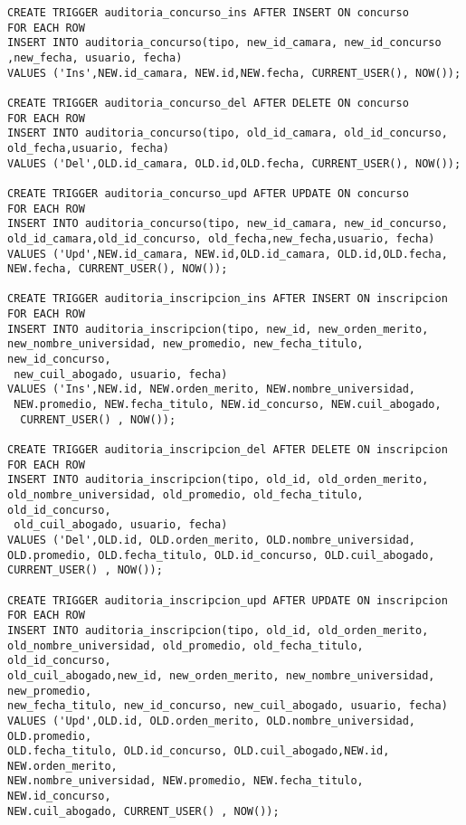 \begin{verbatim}
CREATE TRIGGER auditoria_concurso_ins AFTER INSERT ON concurso
FOR EACH ROW
INSERT INTO auditoria_concurso(tipo, new_id_camara, new_id_concurso
,new_fecha, usuario, fecha)
VALUES ('Ins',NEW.id_camara, NEW.id,NEW.fecha, CURRENT_USER(), NOW());

CREATE TRIGGER auditoria_concurso_del AFTER DELETE ON concurso
FOR EACH ROW
INSERT INTO auditoria_concurso(tipo, old_id_camara, old_id_concurso,
old_fecha,usuario, fecha)
VALUES ('Del',OLD.id_camara, OLD.id,OLD.fecha, CURRENT_USER(), NOW());

CREATE TRIGGER auditoria_concurso_upd AFTER UPDATE ON concurso
FOR EACH ROW
INSERT INTO auditoria_concurso(tipo, new_id_camara, new_id_concurso,
old_id_camara,old_id_concurso, old_fecha,new_fecha,usuario, fecha)
VALUES ('Upd',NEW.id_camara, NEW.id,OLD.id_camara, OLD.id,OLD.fecha, 
NEW.fecha, CURRENT_USER(), NOW());

CREATE TRIGGER auditoria_inscripcion_ins AFTER INSERT ON inscripcion
FOR EACH ROW
INSERT INTO auditoria_inscripcion(tipo, new_id, new_orden_merito, 
new_nombre_universidad, new_promedio, new_fecha_titulo, new_id_concurso,
 new_cuil_abogado, usuario, fecha)
VALUES ('Ins',NEW.id, NEW.orden_merito, NEW.nombre_universidad,
 NEW.promedio, NEW.fecha_titulo, NEW.id_concurso, NEW.cuil_abogado,
  CURRENT_USER() , NOW());

CREATE TRIGGER auditoria_inscripcion_del AFTER DELETE ON inscripcion
FOR EACH ROW
INSERT INTO auditoria_inscripcion(tipo, old_id, old_orden_merito, 
old_nombre_universidad, old_promedio, old_fecha_titulo, old_id_concurso,
 old_cuil_abogado, usuario, fecha)
VALUES ('Del',OLD.id, OLD.orden_merito, OLD.nombre_universidad, 
OLD.promedio, OLD.fecha_titulo, OLD.id_concurso, OLD.cuil_abogado, 
CURRENT_USER() , NOW());

CREATE TRIGGER auditoria_inscripcion_upd AFTER UPDATE ON inscripcion
FOR EACH ROW
INSERT INTO auditoria_inscripcion(tipo, old_id, old_orden_merito,
old_nombre_universidad, old_promedio, old_fecha_titulo, old_id_concurso,
old_cuil_abogado,new_id, new_orden_merito, new_nombre_universidad, new_promedio,
new_fecha_titulo, new_id_concurso, new_cuil_abogado, usuario, fecha)
VALUES ('Upd',OLD.id, OLD.orden_merito, OLD.nombre_universidad, OLD.promedio,
OLD.fecha_titulo, OLD.id_concurso, OLD.cuil_abogado,NEW.id, NEW.orden_merito,
NEW.nombre_universidad, NEW.promedio, NEW.fecha_titulo, NEW.id_concurso,
NEW.cuil_abogado, CURRENT_USER() , NOW());

\end{verbatim}

